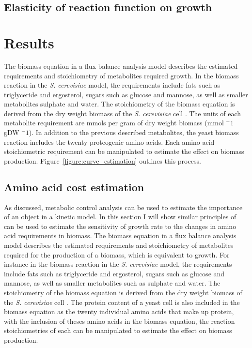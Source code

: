 \subsection{Elasticity of reaction function on growth}

\section{Results}

The biomass equation in a flux balance analysis model describes the estimated requirements and stoichiometry of metabolites required growth. In the biomass reaction in the \emph{S. cerevisiae} model, the requirements include fats such as triglyceride and ergosterol, sugars such as glucose and mannose, as well as smaller metabolites sulphate and water. The stoichiometry of the biomass equation is derived from the dry weight biomass of the \emph{S. cerevisiae} cell \cite{duarte2004}. The units of each metabolite requirement are mmols per gram of dry weight biomass (mmol $^-1$ gDW $^-1$). In addition to the previous described metabolites, the yeast biomass reaction includes the twenty proteogenic amino acids. Each amino acid stoichiometric requirement can be manipulated to estimate the effect on biomass production. Figure~\vref{figure:curve_estimation} outlines this process.

\subsection{Amino acid cost estimation}

As discussed, metabolic control analysis can be used to estimate the importance of an object in a kinetic model. In this section I will show similar principles of can be used to estimate the sensitivity of growth rate to the changes in amino acid requirements in biomass. The biomass equation in a flux balance analysis model describes the estimated requirements and stoichiometry of metabolites required for the production of a biomass, which is equivalent to growth. For instance in the biomass reaction in the \emph{S. cerevisiae} model, the requirements include fats such as triglyceride and ergosterol, sugars such as glucose and mannose, as well as smaller metabolites such as sulphate and water. The stoichiometry of the biomass equation is derived from the dry weight biomass of the \emph{S. cerevisiae} cell \cite{duarte2004a}. The protein content of a yeast cell is also included in the biomass equation as the twenty individual amino acids that make up protein, with the inclusion of theses amino acids in the biomass equation, the reaction stoichiometries of each can be manipulated to estimate the effect on biomass production.

